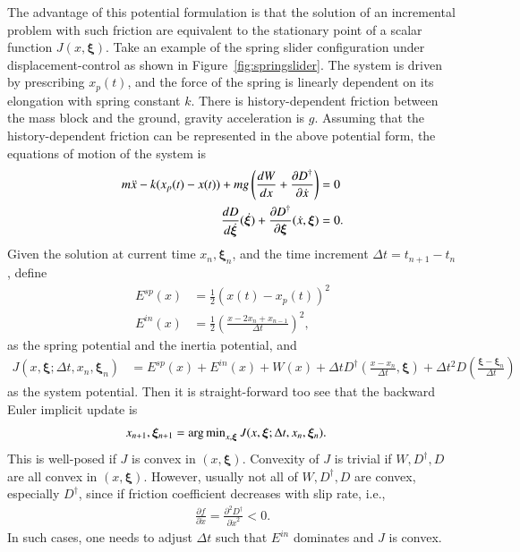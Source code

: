 The advantage of this potential formulation is that the solution of an incremental problem with such friction are equivalent to the stationary point of a scalar function $J(x, \bm{\xi})$. Take an example of the spring slider configuration under displacement-control as shown in Figure~\ref{fig:springslider}. 
The system is driven by prescribing $x_p(t)$, 
and the force of the spring is linearly dependent on its elongation with spring constant $k$. 
There is history-dependent friction between the mass block and the ground, 
gravity acceleration is $g$. 
Assuming that the history-dependent friction can be represented in the above potential form, 
the equations of motion of the system is 
\begin{align}
    m\Ddot{x} - k(x_p(t) - x(t)) + mg \left(\frac{d W}{d x} + \frac{\partial D^\dagger}{\partial \dot{x}}\right)&= 0 \label{eq:springsliderEOM1} \\
    \frac{d D}{d \dot{\boldsymbol{\xi}}}(\dot{\bm{\xi}}) + \frac{\partial D^\dagger}{\partial \boldsymbol{\xi}}(\dot{x}, \bm{\xi}) &= 0 \notag. 
\end{align}
Given the solution at current time $x_n, \bm{\xi}_n$, 
and the time increment $\Delta t = t_{n+1} - t_n$, 
define 
\begin{align}
    E^{sp}(x) &= \frac{1}{2}\left(x(t) - x_p(t)\right)^2 \label{eq:Esp} \\
    E^{in}(x) &= \frac{1}{2}\left(\frac{x - 2 x_n + x_{n-1}}{\Delta t}\right)^2 \label{eq:Ein}, 
\end{align}
as the spring potential and the inertia potential, 
and
\begin{align}
    J(x, \bm{\xi}; \Delta t, x_n, \bm{\xi}_n) &= E^{sp}(x) + E^{in}(x) + W(x) + \Delta t D^\dagger\left(\frac{x - x_n}{\Delta t}, \bm{\xi}\right) + \Delta t^2 D\left(\frac{\bm{\xi} - \bm{\xi}_n}{\Delta t}\right) \label{eq:Jfunctional}
\end{align}
as the system potential. 
Then it is straight-forward too see that the backward Euler implicit update is
\begin{align}
    x_{n+1}, \bm{\xi}_{n+1} &= \operatorname{arg\,min}_{x, \bm{\xi}} J(x, \bm{\xi}; \Delta t, x_n, \bm{\xi}_{n}) \label{eq:JfunctionalMin}. 
\end{align}
This is well-posed if $J$ is convex in $(x, \bm{\xi})$. 
Convexity of $J$ is trivial if $W, D^\dagger, D$ are all convex in $(x, \bm{\xi})$. 
However, 
usually not all of $W, D^\dagger, D$ are convex, 
especially $D^{\dagger}$, 
since if friction coefficient decreases with slip rate, 
i.e., 
\begin{align}
    \frac{\partial f}{\partial \dot{x}} = \frac{\partial^2D^\dagger}{\partial \dot{x}^2} < 0 \label{eq:nonConvexDdagger}. 
\end{align}
In such cases, 
one needs to adjust $\Delta t$ such that $E^{in}$ dominates and $J$ is convex. 

